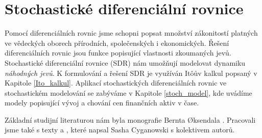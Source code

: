 \documentclass[a4paper,12pt]{report}
\theoremstyle{definition} \newtheorem{definice}[veta]{Definice}
\theoremstyle{remark}
\begin{document}

\section{Stochastické diferenciální rovnice}

Pomocí diferenciálních rovnic jsme schopni popsat množství zákonitostí platných ve vědeckých oborech přírodních, společenských i ekonomických.
Řešení diferenciálních rovnic jsou funkce popisující vlastnosti zkoumaných jevů.
Stochastické diferenciální rovnice (SDR) nám umožňují modelovat dynamiku \textit{náhodných jevů}.
K formulování a řešení SDR je využíván It\^oův kalkul popsaný v Kapitole \ref{Ito_kalkul}.
Aplikací stochastických diferenciálních rovnic ve stochastickém modelování se zabýváme v Kapitole \ref{stoch_model}, kde uvádíme modely popisující vývoj a chování cen finančních aktiv v čase.

Základní studijní literaturou nám byla monografie Bernta {\O}ksendala \cite{oksendal2003stochastic}.
Pracovali jsme také s texty \cite{cyganowski1998maple} a \cite{cyganowski2002elementary}, které napsal Sasha Cyganowski s kolektivem autorů.

\end{document}
